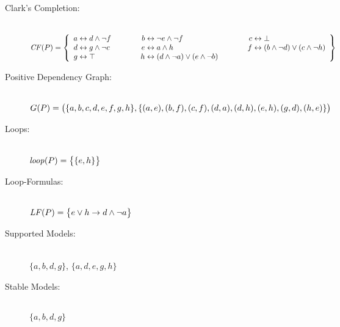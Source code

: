 \begin{Loesung}
\begin{UList}
\begin{description}
%
\item[Clark's Completion:] ~\\
\hspace*{-15mm}
\(
\Comp{\Pi} =
\left\{
\begin{array}{r@{}c@{}l@{\hspace{13.8mm}}r@{}c@{}l@{\hspace{13.8mm}}r@{}c@{}l}
a & {} \leftrightarrow {} & d\wedge \neg f &
b & {} \leftrightarrow {} & \neg e\wedge\neg f &
c & {} \leftrightarrow {} & \bot
\\
d & {} \leftrightarrow {} & g\wedge\neg c &
e & {} \leftrightarrow {} & a\wedge h &
f & {} \leftrightarrow {} & (b\wedge\neg d) \vee (c\wedge\neg h)
\\
g & {} \leftrightarrow {} & \top &
h & {} \leftrightarrow {} & (d\wedge\neg a) \vee (e\wedge\neg b)
\end{array}
\right\}
\)
%
\item[Positive Dependency Graph:] ~\\
$G(P)=\big(\{a,b,c,d,e,f,g,h\},\{(a,e),(b,f),(c,f),(d,a),(d,h),(e,h),(g,d),(h,e)\}\big)$
%
\item[Loops:] ~\\
$\mathit{loop}(P)=\big\{\{e,h\}\big\}$
%
\item[Loop-Formulas:] ~\\
$\mathit{LF}(P)=\big\{e\vee h\rightarrow d\wedge\neg a\big\}$
%
\item[Supported Models:] ~\\
$\{a,b,d,g\}$, $\{a,d,e,g,h\}$
%
\item[Stable Models:] ~\\
$\{a,b,d,g\}$
%
\end{description}
\end{UList}
\end{Loesung}

